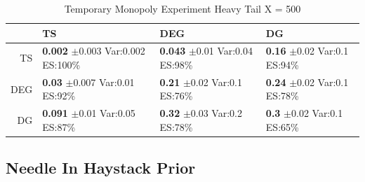 \documentclass[11pt,letterpaper]{article}
\begin{document}
\begin{table}[H]
\centering
\caption{Temporary Monopoly Experiment Heavy Tail X = 500} 
\begin{tabular}{rlll}
  \hline
 & TS & DEG &  DG \\ 
  \hline
TS & \makecell{\textbf{0.002} $\pm$0.003\\Var:0.002\\ES:100\%} & \makecell{\textbf{0.043} $\pm$0.01\\Var:0.04\\ES:98\%} & \makecell{\textbf{0.16} $\pm$0.02\\Var:0.1\\ES:94\%} \\ 
  DEG & \makecell{\textbf{0.03} $\pm$0.007\\Var:0.01\\ES:92\%} & \makecell{\textbf{0.21} $\pm$0.02\\Var:0.1\\ES:76\%} & \makecell{\textbf{0.24} $\pm$0.02\\Var:0.1\\ES:78\%} \\ 
   DG & \makecell{\textbf{0.091} $\pm$0.01\\Var:0.05\\ES:87\%} & \makecell{\textbf{0.32} $\pm$0.03\\Var:0.2\\ES:78\%} & \makecell{\textbf{0.3} $\pm$0.02\\Var:0.1\\ES:65\%} \\ 
   \hline
\end{tabular}
\end{table}

\subsection*{Needle In Haystack Prior}
\end{document}
